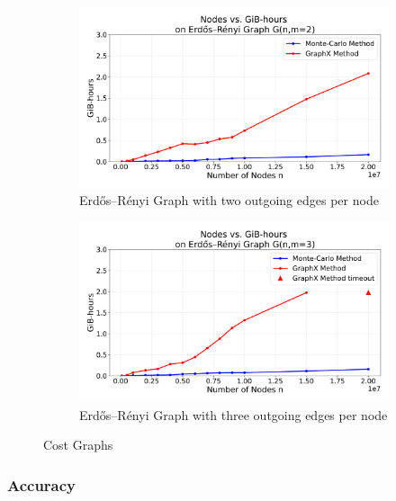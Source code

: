 \begin{figure}[H]
    \centering
    \begin{subfigure}[t]{0.5\linewidth}
        \centering
        \includegraphics[width=\linewidth]{images/plots/ER_2edg/gbhrs_nodes_er_graph_2edges.pdf}
        \caption{Erdős–Rényi Graph with two outgoing edges per node}
        \label{fig:wikigibhrs}
    \end{subfigure}
    \begin{subfigure}[t]{0.5\linewidth}
        \centering
        \includegraphics[width=\linewidth]{images/plots/ER_3edg/gbhrs_nodes_er_graph_3edges.pdf}
        \caption{Erdős–Rényi Graph with three outgoing edges per node}
        \label{fig:wikigibhrs}
    \end{subfigure}
    \caption{Cost Graphs}
    \label{fig:wiki-comparison}
\end{figure}

\subsubsection{Accuracy}

